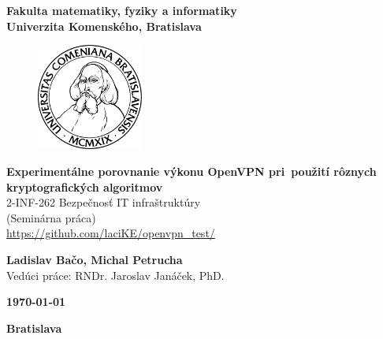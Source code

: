 \documentclass[12pt,a4paper]{article}
\begin{document}
\thispagestyle{empty}
\begin{center}
    \large{
        \textbf{
            Fakulta matematiky, fyziky a informatiky\\
            Univerzita Komenského, Bratislava
        }
    }
\end{center}

\vspace{2cm}

\begin{figure}[!h]
    \centering
    \includegraphics[width=3.5cm]{komlogo-new.pdf}
\end{figure}

\vspace{1cm}

\begin{center}
    \large{
        \textbf{
            Experimentálne porovnanie výkonu OpenVPN pri~použití rôznych kryptografických algoritmov
        }\\

        2-INF-262	Bezpečnosť IT infraštruktúry \\
        (Seminárna práca)\\
        \url{https://github.com/laciKE/openvpn\_test/}

        \vspace{1.5cm}

        \textbf{
            Ladislav Bačo, Michal Petrucha
        } \\
        Vedúci práce: RNDr. Jaroslav Janáček, PhD.

    }
\end{center}

\vfill

\begin{multicols}{2}
    \begin{flushleft}
        \textbf{\today}
    \end{flushleft}
    \begin{flushright}
        \textbf{Bratislava}
    \end{flushright}
\end{multicols}

\newpage
\end{document}
